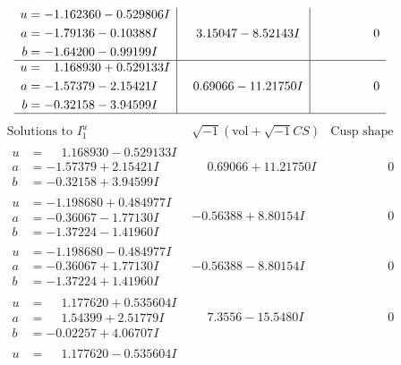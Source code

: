 \documentclass[1p]{elsarticle_modified}
\theoremstyle{definition}
\newcommand{\I}{\sqrt{-1}}
\begin{document}
$$\begin{array}{c|c|c}
\begin{aligned}
u &= -1.162360 - 0.529806 I \\
a &= -1.79136 - 0.10388 I \\
b &= -1.64200 - 0.99199 I\end{aligned}
 & \phantom{-}3.15047 - 8.52143 I & \phantom{-0.000000 } 0 \\ \hline\begin{aligned}
u &= \phantom{-}1.168930 + 0.529133 I \\
a &= -1.57379 - 2.15421 I \\
b &= -0.32158 - 3.94599 I\end{aligned}
 & \phantom{-}0.69066 - 11.21750 I & \phantom{-0.000000 } 0\\
 \hline 
 \end{array}$$\newpage$$\begin{array}{c|c|c}  
\text{Solutions to }I^u_{1}& \I (\text{vol} + \sqrt{-1}CS) & \text{Cusp shape}\\
 \hline 
\begin{aligned}
u &= \phantom{-}1.168930 - 0.529133 I \\
a &= -1.57379 + 2.15421 I \\
b &= -0.32158 + 3.94599 I\end{aligned}
 & \phantom{-}0.69066 + 11.21750 I & \phantom{-0.000000 } 0 \\ \hline\begin{aligned}
u &= -1.198680 + 0.484977 I \\
a &= -0.36067 - 1.77130 I \\
b &= -1.37224 - 1.41960 I\end{aligned}
 & -0.56388 + 8.80154 I & \phantom{-0.000000 } 0 \\ \hline\begin{aligned}
u &= -1.198680 - 0.484977 I \\
a &= -0.36067 + 1.77130 I \\
b &= -1.37224 + 1.41960 I\end{aligned}
 & -0.56388 - 8.80154 I & \phantom{-0.000000 } 0 \\ \hline\begin{aligned}
u &= \phantom{-}1.177620 + 0.535604 I \\
a &= \phantom{-}1.54399 + 2.51779 I \\
b &= -0.02257 + 4.06707 I\end{aligned}
 & \phantom{-}7.3556 - 15.5480 I & \phantom{-0.000000 } 0 \\ \hline\begin{aligned}
u &= \phantom{-}1.177620 - 0.535604 I \\

\end{aligned}
\end{array}$$
\end{document}
